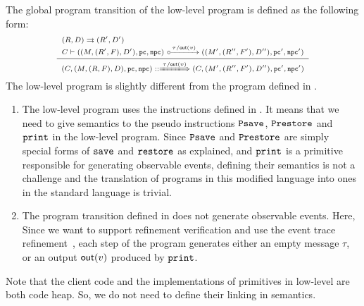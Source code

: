 The global program transition of the low-level \sparc{} program is defined
as the following form:
\[
    \scriptsize
    \infer
    {
        \LGlobTrans{(\code, (\Mem, (\RFile, \Wstack), \DBuf), \pc, \npc)}
            { \empmsg / \outEvt{\val} }
            {(\code, (\Mem', (\RFile'', \Wstack'), \DBuf''), \pc', \npc')}
    }
    {
        \begin{array}{l}
            \Dstep{(\RFile, \DBuf)}{(\RFile', \DBuf')} \\
            \llocalstep{\code}
                {((\Mem, (\RFile', \Wstack), \DBuf'), \pc, \npc)}
                { \empmsg / \outEvt{\val} }
                {((\Mem', (\RFile'', \Wstack'), \DBuf''), \pc', \npc')}
        \end{array}
    }
\]
The low-level \sparc{} program is slightly different
from the \sparc{} program defined in
\Sec{\ref{sec:modeling}}.
\begin{enumerate}
    \item The low-level \sparc{} program uses the
        instructions defined in
        \Fig{\ref{fig:syntax-of-concur-pseudo-sparc}}.
        It means that we need to give semantics to the %
        pseudo instructions $\texttt{Psave}$, $\texttt{Prestore}$ and
        $\texttt{print}$ in the low-level \sparc{} program.
        Since $\texttt{Psave}$ and $\texttt{Prestore}$
        are simply special forms of $\texttt{save}{}$ and
        $\texttt{restore}{}$ as explained,
        and $\texttt{print}$ is a primitive
        responsible for generating observable events,
        defining their semantics is not a challenge
        and the translation of programs in this modified language 
        into ones in the standard \sparc{} language is 
        trivial.
    \item The program transition defined in
        \Sec{\ref{sec:modeling}} does not generate
        observable events. 
        Here, Since we want to support refinement verification 
        and use the event trace refinement~\cite{liang14lics}, 
        each step of the program
        generates either an empty message $\tau$,
        or an output $\textsf{out}({v})$ produced
        by $\texttt{print}$.
\end{enumerate}

Note that the client
code and the implementations of primitives
in low-level are both \sparc{} code heap. So, we do not need
to define their linking in semantics.


